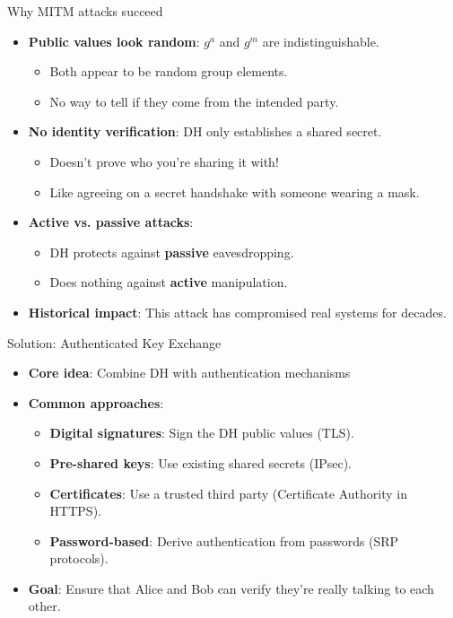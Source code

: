 \documentclass[aspectratio=169, lualatex, handout]{beamer}
\begin{document}
\begin{frame}{Why MITM attacks succeed}
	\begin{itemize}[<+->]
		\item \textbf{Public values look random}: $g^a$ and $g^m$ are indistinguishable.
		      \begin{itemize}
			      \item Both appear to be random group elements.
			      \item No way to tell if they come from the intended party.
		      \end{itemize}
		\item \textbf{No identity verification}: DH only establishes a shared secret.
		      \begin{itemize}
			      \item Doesn't prove who you're sharing it with!
			      \item Like agreeing on a secret handshake with someone wearing a mask.
		      \end{itemize}
		\item \textbf{Active vs. passive attacks}:
		      \begin{itemize}
			      \item DH protects against \textbf{passive} eavesdropping.
			      \item Does nothing against \textbf{active} manipulation.
		      \end{itemize}
		\item \textbf{Historical impact}: This attack has compromised real systems for decades.
	\end{itemize}
\end{frame}

\begin{frame}{Solution: Authenticated Key Exchange}
	\begin{itemize}[<+->]
		\item \textbf{Core idea}: Combine DH with authentication mechanisms
		\item \textbf{Common approaches}:
		      \begin{itemize}
			      \item \textbf{Digital signatures}: Sign the DH public values (TLS).
			      \item \textbf{Pre-shared keys}: Use existing shared secrets (IPsec).
			      \item \textbf{Certificates}: Use a trusted third party (Certificate Authority in HTTPS).
			      \item \textbf{Password-based}: Derive authentication from passwords (SRP protocols).
		      \end{itemize}
		\item \textbf{Goal}: Ensure that Alice and Bob can verify they're really talking to each other.
	\end{itemize}
\end{frame}
\end{document}
